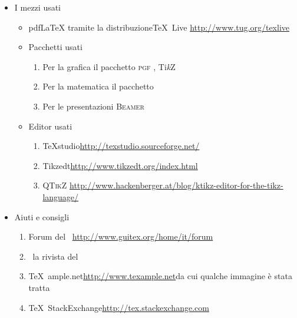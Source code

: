 	\begin{itemize}
		\item I mezzi usati
		\begin{itemize}
			\item pdf\LaTeX{} tramite la distribuzione\TeX{}~Live\newline
			\url{http://www.tug.org/texlive}
			\item Pacchetti usati
			\begin{enumerate}
				\item Per la grafica  il pacchetto \textsc{pgf} \pgfversion, Ti\emph{k}Z
				\item Per la matematica il pacchetto \AmS
				\item Per le presentazioni \textsc{Beamer}
			\end{enumerate}
			\item Editor usati
			\begin{enumerate}
				\item \TeX{}studio\newline \url{http://texstudio.sourceforge.net/} %
				\item Tikzedt\newline \url{http://www.tikzedt.org/index.html} %
				\item \textsc{QTikZ}\newline
				\url{http://www.hackenberger.at/blog/ktikz-editor-for-the-tikz-language/}
			\end{enumerate}
		\end{itemize}
		\item Aiuti e consigli
		\begin{enumerate}
			\item Forum del \guit\ \GuITtext\newline \url{http://www.guitex.org/home/it/forum}
			\item \Ars\ la rivista del \guit\
			\item \TeX{}~ample.net\newline \url{http://www.texample.net}\newline da cui qualche immagine è stata tratta
			\item \TeX{}~StackExchange\newline \url{http://tex.stackexchange.com}
		\end{enumerate}
	\end{itemize}
	\clearpage